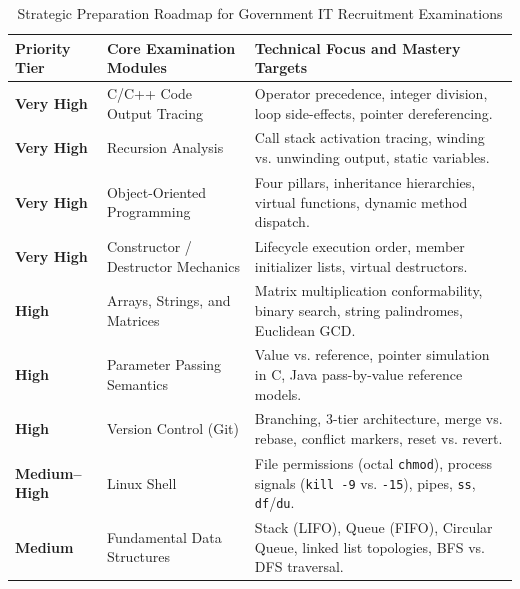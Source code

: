 \begin{table}[htbp]
\centering
\small
\begin{tabularx}{\textwidth}{l X X}
\toprule
\textbf{Priority Tier} & \textbf{Core Examination Modules} & \textbf{Technical Focus and Mastery Targets} \\
\midrule
\textbf{Very High} & C/C++ Code Output Tracing & Operator precedence, integer division, loop side-effects, pointer dereferencing. \\
\textbf{Very High} & Recursion Analysis & Call stack activation tracing, winding vs. unwinding output, static variables. \\
\textbf{Very High} & Object-Oriented Programming & Four pillars, inheritance hierarchies, virtual functions, dynamic method dispatch. \\
\textbf{Very High} & Constructor / Destructor Mechanics & Lifecycle execution order, member initializer lists, virtual destructors. \\
\textbf{High} & Arrays, Strings, and Matrices & Matrix multiplication conformability, binary search, string palindromes, Euclidean GCD. \\
\textbf{High} & Parameter Passing Semantics & Value vs. reference, pointer simulation in C, Java pass-by-value reference models. \\
\textbf{High} & Version Control (Git) & Branching, 3-tier architecture, merge vs. rebase, conflict markers, reset vs. revert. \\
\textbf{Medium--High} & Linux Shell & File permissions (octal \texttt{chmod}), process signals (\texttt{kill -9} vs. \texttt{-15}), pipes, \texttt{ss}, \texttt{df}/\texttt{du}. \\
\textbf{Medium} & Fundamental Data Structures & Stack (LIFO), Queue (FIFO), Circular Queue, linked list topologies, BFS vs. DFS traversal. \\
\bottomrule
\end{tabularx}
\caption{Strategic Preparation Roadmap for Government IT Recruitment Examinations}
\label{tab:preparation_priorities}
\end{table}
